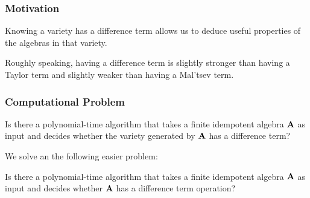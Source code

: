 \documentclass[12pt,xcolor=dvipsnames%
   ]{beamer}
\begin{document}
\begin{frame}
  \frametitle{Motivation}
  Knowing a variety has a difference term allows us to deduce useful
  properties of the algebras in that variety.

  Roughly speaking, having a difference term is slightly stronger than having
  a Taylor term and slightly weaker than having a Mal'tsev term.
\end{frame}

\begin{frame}
  \frametitle{Computational Problem}
  \begin{problem}[1]
  \label{prob:1}
  Is there a polynomial-time algorithm that takes a finite
  idempotent algebra $\mathbf{A}$ as input and decides whether the variety generated by
  $\mathbf{A}$ has a difference term?
\end{problem}

We solve an the following easier problem:
\begin{problem}[2]
  \label{prob:2}
  Is there a polynomial-time algorithm that takes a finite
  idempotent algebra $\mathbf{A}$ as input and decides whether 
  $\mathbf{A}$ has a difference term operation?
\end{problem}
\end{frame}
\end{document}
